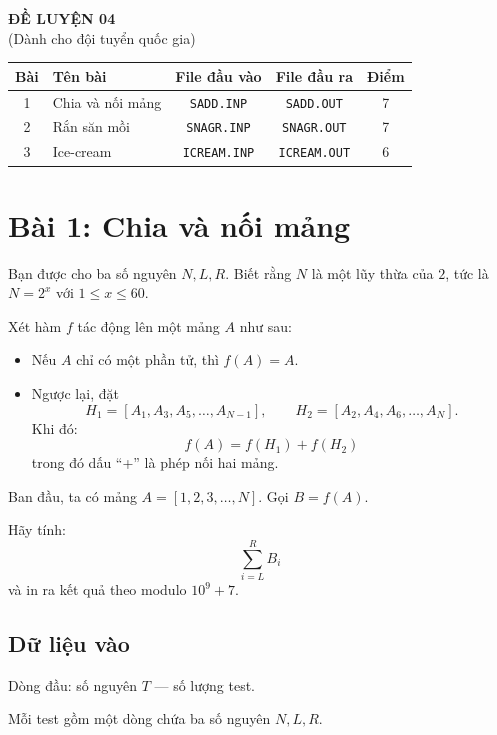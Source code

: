 \begin{center}
    {\LARGE \textbf{ĐỀ LUYỆN 04}}\\[6pt]
    {\large (Dành cho đội tuyển quốc gia)}
\end{center}

\begin{tabularx}{\textwidth}{|c|X|c|c|c|}
\hline
\textbf{Bài} & \textbf{Tên bài} & \textbf{File đầu vào} & \textbf{File đầu ra} & \textbf{Điểm} \\
\hline
1 & Chia và nối mảng & \texttt{SADD.INP} & \texttt{SADD.OUT} & 7 \\
\hline
2 & Rắn săn mồi & \texttt{SNAGR.INP} & \texttt{SNAGR.OUT} & 7 \\
\hline
3 & Ice-cream & \texttt{ICREAM.INP} & \texttt{ICREAM.OUT} & 6 \\
\hline
\end{tabularx}



\section*{Bài 1: Chia và nối mảng}

Bạn được cho ba số nguyên $N, L, R$. Biết rằng $N$ là một lũy thừa của $2$, tức là $N = 2^x$ với $1 \le x \le 60$.

Xét hàm $f$ tác động lên một mảng $A$ như sau:

\begin{itemize}
    \item Nếu $A$ chỉ có một phần tử, thì $f(A)=A$.
    \item Ngược lại, đặt
    \[
        H_1 = [A_1, A_3, A_5, \ldots, A_{N-1}], \qquad
        H_2 = [A_2, A_4, A_6, \ldots, A_N].
    \]
    Khi đó:
    \[
        f(A) = f(H_1) + f(H_2)
    \]
    trong đó dấu “+” là phép nối hai mảng.
\end{itemize}

Ban đầu, ta có mảng $A = [1, 2, 3, \ldots, N]$.  
Gọi $B = f(A)$.

Hãy tính:
\[
\sum_{i=L}^{R} B_i
\]
và in ra kết quả theo modulo $10^9+7$.

\subsection*{Dữ liệu vào}

Dòng đầu: số nguyên $T$ — số lượng test.

Mỗi test gồm một dòng chứa ba số nguyên $N, L, R$.

